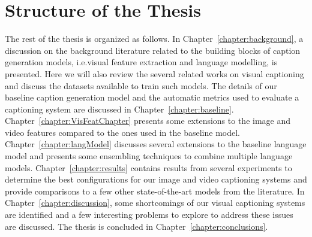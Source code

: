 \section{Structure of the Thesis}
\label{section:structure} 
The rest of the thesis is organized as follows.
In Chapter~\ref{chapter:background}, a discussion on the background literature
related to the building blocks of caption generation models, i.e.\@ visual
feature extraction and language modelling, is presented. 
Here we will also review the several related works on visual captioning
and discuss the datasets available to train such models.
The details of our baseline caption generation model and the automatic metrics
used to evaluate a captioning system are discussed in
Chapter~\ref{chapter:baseline}. 
Chapter~\ref{chapter:VisFeatChapter} presents some extensions to the image
and video features compared to the ones used in the baseline model.
Chapter~\ref{chapter:langModel} discusses several extensions to the baseline
language model and presents some ensembling techniques to combine multiple
language models.
Chapter~\ref{chapter:results} contains results from several experiments to
determine the best configurations for our image and video captioning systems and
provide comparisons to a few other state-of-the-art models from the literature.
In Chapter~\ref{chapter:discussion}, some shortcomings of our visual captioning
systems are identified and a few interesting problems to explore to address
these issues are discussed.
The thesis is concluded in Chapter~\ref{chapter:conclusions}.

